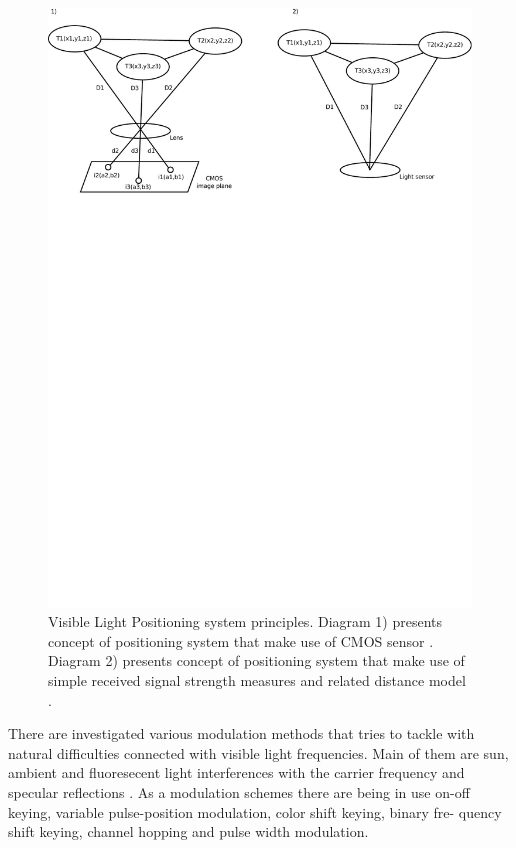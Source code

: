\documentclass[../main.tex]{subfiles}
\begin{document}
\begin{figure}[ht]
\includegraphics[width=\textwidth, trim={0 20cm 0 0},clip]{pictures/visible_positioning.pdf}
\centering
\caption{Visible Light Positioning system principles. Diagram 1) presents concept of positioning system that make use of CMOS sensor  \cite{visible_light_positioning}. Diagram 2) presents concept of positioning system that make use of simple received signal strength measures and related distance model \cite{visible_light_positioning_epsilon}.}
\label{fig:visible_positioning}
\end{figure}

There are investigated various modulation methods that tries to tackle with natural difficulties connected with visible light frequencies. Main of them are sun, ambient and fluoresecent light interferences with the carrier frequency and specular reflections \cite{visible_light_positioning}. As a modulation schemes there are being in use on-off keying, variable pulse-position modulation, color shift keying, binary fre-
quency shift keying, channel hopping and pulse width modulation.
\end{document}
